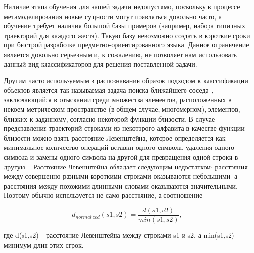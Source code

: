 \documentclass[a5paper]{article}
\begin{document}
Наличие этапа обучения для нашей задачи недопустимо, поскольку в процессе метамоделирования новые сущности могут появляться довольно часто, а обучение требует наличия большой базы примеров (например, набора типичных траекторий для каждого жеста). Такую базу невозможно создать в короткие сроки при быстрой разработке предметно-ориентированного языка. Данное ограничение является довольно серьезным и, к сожалению, не позволяет нам использовать данный вид классификаторов для решения поставленной задачи.

Другим часто используемым в распознавании образов подходом к классификации объектов является так называемая задача поиска ближайшего соседа~\cite{nns1, nns2}, заключающийся в отыскании среди множества элементов, расположенных в некоем метрическом пространстве (в общем случае, многомерном), элементов, близких к заданному, согласно некоторой функции близости. В случае представления траекторий строками из некоторого алфавита в качестве функции близости можно взять расстояние Левенштейна, которое определяется как минимальное количество операций вставки одного символа, удаления одного символа и замены одного символа на другой для превращения одной строки в другую~\cite{levenshtein}. Расстояние Левенштейна обладает следующим недостатком: расстояния между совершенно разными короткими строками оказываются небольшими, а расстояния между похожими длинными словами оказываются значительными. Поэтому обычно используется не само расстояние, а соотношение 

\begin{equation}
\label{levenshtein}
d_{normalized}(s1,s2) = \frac{d(s1,s2)}{min(s1,s2)},
\end{equation}

где d(s1,s2) -- расстояние Левенштейна между строками s1 и s2, а min(s1,s2) -- минимум длин этих строк.
\end{document}
